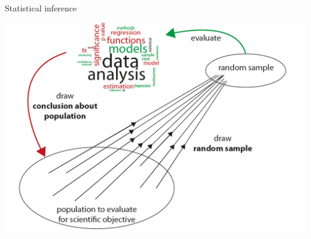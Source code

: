 \documentclass{beamer}\usepackage[]{graphicx}\usepackage[]{color}
\begin{document}
\begin{frame}{Statistical inference}
  \begin{center}
    \includegraphics[width=.7\linewidth]{inference.jpg}
  \end{center}
\end{frame}
\end{document}
